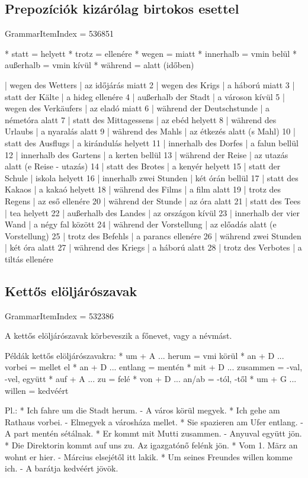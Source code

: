 \documentclass{article}
\newenvironment{desc}{\verbatim}{\endverbatim}
\newenvironment{exmp}{\verbatim}{\endverbatim}
\begin{document}
\subsection{Prepozíciók kizárólag birtokos esettel}

GrammarItemIndex = 536851

\begin{desc}
* statt = helyett
* trotz = ellenére
* wegen = miatt
* innerhalb = vmin belül
* außerhalb = vmin kívül
* während = alatt (időben)
\end{desc}

\begin{exmp}
1 | wegen des Wetters | az időjárás miatt
2 | wegen des Krigs | a háború miatt
3 | statt der Kälte | a hideg ellenére
4 | außerhalb der Stadt | a városon kívül
5 | wegen des Verkäufers | az eladó miatt
6 | während der Deutschstunde | a németóra alatt
7 | statt des Mittagessens | az ebéd helyett
8 | während des Urlaubs | a nyaralás alatt
9 | während des Mahls | az étkezés alatt (s Mahl)
10 | statt des Ausflugs | a kirándulás helyett
11 | innerhalb des Dorfes | a falun bellül
12 | innerhalb des Gartens | a kerten bellül
13 | während der Reise | az utazás alatt (e Reise - utazás)
14 | statt des Brotes | a kenyér helyett
15 | statt der Schule | iskola helyett
16 | innerhalb zwei Stunden | két órán bellül
17 | statt des Kakaos | a kakaó helyett
18 | während des Films | a film alatt
19 | trotz des Regens | az eső ellenére
20 | während der Stunde | az óra alatt
21 | statt des Tees | tea helyett
22 | außerhalb des Landes | az országon kívül
23 | innerhalb der vier Wand | a négy fal között
24 | während der Vorstellung | az előadás alatt (e Vorstellung)
25 | trotz des Befehls | a parancs ellenére
26 | während zwei Stunden | két óra alatt
27 | während des Kriegs | a háború alatt
28 | trotz des Verbotes | a tiltás ellenére
\end{exmp}

\subsection{Kettős elöljárószavak}

GrammarItemIndex = 532386

\begin{desc}
A kettős elöljárószavak körbeveszik a főnevet, vagy a névmást.

Példák kettős elöljárószavakra:
* um + A ... herum = vmi körül
* an + D ... vorbei = mellet el
* an + D ... entlang = mentén
* mit + D ... zusammen = -val, -vel, együtt
* auf + A ... zu = felé
* von + D ... an/ab = -tól, -től
* um + G ... willen = kedvéért

Pl.: * Ich fahre um die Stadt herum. - A város körül megyek.
* Ich gehe am Rathaus vorbei. - Elmegyek a városháza mellet.
* Sie spazieren am Ufer entlang. - A part mentén sétálnak.
* Er kommt mit Mutti zusammen. - Anyuval együtt jön.
* Die Direktorin kommt auf uns zu. Az igazgatónő felénk jön.
* Vom 1. März an wohnt er hier. - Március elsejétől itt lakik.
* Um seines Freundes willen komme ich. - A barátja kedvéért jövök.
\end{desc}
\end{document}
